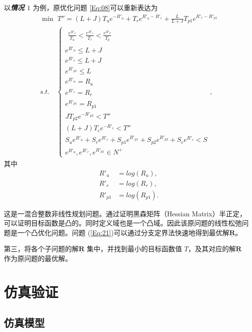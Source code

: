 以\emph{\textbf{情况 $1$}} 为例，原优化问题 \eqref{Eq:08}可以重新表达为
\begin{equation}\label{Eq:21}
\begin{split}
&\min \,\, T''=(L+J)T_ue^{-R'_u}+T_re^{R'_u-R'_r}+\frac{L}{L+J}T_{p1}e^{R'_r-R'_{p1}}\\
&s.t.\quad  \left\{\begin{array}{l}
\begin{aligned}\frac{e^{R'_u}}{T_u}<\frac{e^{R'_r}}{T_r}<\frac{e^{R'_p}}{T_p}\end{aligned}\\
e^{R'_u}\leq L+J\\
e^{R'_r}\leq L+J\\
e^{R'_{p1}}\leq L\\
e^{R'_{u}}=R_u\\
e^{R'_{r}}=R_{r}\\
e^{R'_{p1}}=R_{p1} \\
JT_{p2}e^{-R'_{p2}}<T''\\
(L+J)T_{c}e^{-R'_{c}}<T''\\
S_ue^{R'_u}+S_re^{R'_r}+S_{p1}e^{R'_{p1}}+S_{p2}e^{R'_{p2}}+S_ce^{R'_c}<S\\
e^{R'_u},e^{R'_r},e^{R'_{p1}}\in N^{+} \end{array}\right.,
\end{split}
\end{equation}
其中
\begin{eqnarray*}
&R'_u &= log(R_u),\\
&R'_r &= log(R_r),\\
&R'_{p1} &= log(R_{p1}).
\end{eqnarray*}

这是一混合整数非线性规划问题。通过证明黑森矩阵（Hessian Matrix）半正定，可以证明目标函数是凸的。同时定义域也是一个凸域。因此该原问题的线性松弛问题是一个凸优化问题。问题 (\ref{Eq:21})可以通过分支定界法快速地得到最优解$\mathbf{\underline{R}}$。

第三，将各个子问题的解$\mathbf{\underline{R}}$ 集中，并找到最小的目标函数值 $T$，及其对应的解$\mathbf{\underline{R}}$ 作为原问题的最优解。

\section{仿真验证}\label{sec4}

\subsection{仿真模型}
